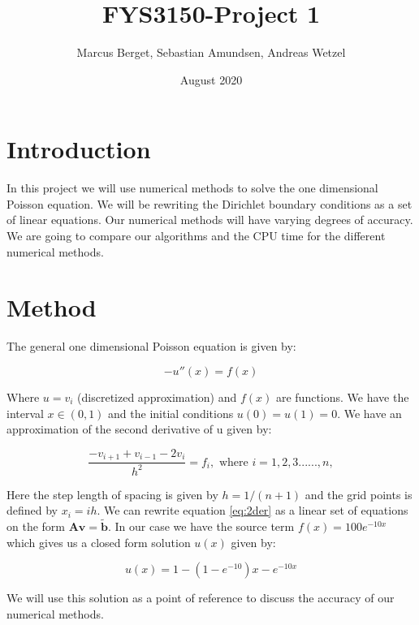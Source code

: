 \documentclass[norsk,a4paper,12pt]{article}
\title{FYS3150-Project 1}
\author{Marcus Berget, Sebastian Amundsen, Andreas Wetzel}
\date{August 2020}
\begin{document}
\maketitle

\begin{abstract}

\end{abstract}

\section{Introduction}

In this project we will use numerical methods to solve the one dimensional Poisson equation. We will be rewriting the Dirichlet boundary conditions as a set of linear equations. Our numerical methods will have varying degrees of accuracy. We are going to compare our algorithms and the CPU time for the different numerical methods. 

\section{Method}

The general one dimensional Poisson equation is given by:

\begin{equation}
-u''(x)=f(x)
 \label{eq:udd}
 \end{equation}

Where $u=v_i$ (discretized approximation) and $f(x)$ are functions. We have the interval $x\in(0,1)$ and the initial conditions $u(0)=u(1)=0$. We have an approximation of the second derivative of u given by:

\begin{equation}
\frac{-v_{i+1}+v_{i-1}-2v_i}{h^2}=f_i, \textrm{  where  } i=1,2,3......,n,
 \label{eq:2der}
 \end{equation}
 
 Here the step length of spacing is given by $h=1/(n+1)$ and the grid points is defined by $x_i=ih$. We can rewrite equation \ref{eq:2der} as a linear set of equations on the form $\textbf{A}\textbf{v}=\tilde{\textbf{b}}$. In our case we have the source term $f(x)=100e^{-10x}$ which gives us a closed form solution $u(x)$ given by:

\begin{equation}
u(x)=1-(1-e^{-10})x-e^{-10x}
 \label{eq:d_i}
 \end{equation}

We will use this solution as a point of reference to discuss the accuracy of our numerical methods. 
\end{document}
